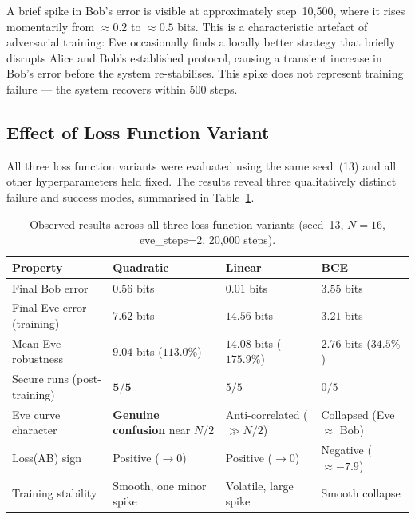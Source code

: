 \documentclass[12pt, a4paper]{article}
\begin{document}
A brief spike in Bob's error is visible at approximately step~10{,}500,
where it rises momentarily from $\approx 0.2$ to $\approx 0.5$ bits.
This is a characteristic artefact of adversarial training: Eve
occasionally finds a locally better strategy that briefly disrupts
Alice and Bob's established protocol, causing a transient increase
in Bob's error before the system re-stabilises. This spike does not
represent training failure --- the system recovers within 500 steps.

\subsection{Effect of Loss Function Variant}
\label{subsec:loss_variant_results}

All three loss function variants were evaluated using the same seed~(13)
and all other hyperparameters held fixed. The results reveal three
qualitatively distinct failure and success modes, summarised in
Table~\ref{tab:loss_variant_results}.

\begin{table}[H]
  \centering
  \caption{Observed results across all three loss function variants
           (seed~13, $N=16$, eve\_steps=2, 20{,}000 steps).}
  \label{tab:loss_variant_results}
  \renewcommand{\arraystretch}{1.5}
  \begin{tabularx}{\linewidth}{@{} l X X X @{}}
    \toprule
    \textbf{Property} & \textbf{Quadratic} &
    \textbf{Linear} & \textbf{BCE} \\
    \midrule
    Final Bob error &
      $\mathbf{0.56}$ bits &
      $0.01$ bits &
      $3.55$ bits \\[4pt]
    Final Eve error (training) &
      $\mathbf{7.62}$ bits &
      $14.56$ bits &
      $3.21$ bits \\[4pt]
    Mean Eve robustness &
      $\mathbf{9.04}$ bits ($113.0\%$) &
      $14.08$ bits ($175.9\%$) &
      $2.76$ bits ($34.5\%$) \\[4pt]
    Secure runs (post-training) &
      $\mathbf{5/5}$ &
      $5/5$ &
      $0/5$ \\[4pt]
    Eve curve character &
      \textbf{Genuine confusion} near $N/2$ &
      Anti-correlated ($\gg N/2$) &
      Collapsed (Eve $\approx$ Bob) \\[4pt]
    Loss(AB) sign &
      Positive ($\to 0$) &
      Positive ($\to 0$) &
      Negative ($\approx -7.9$) \\[4pt]
    Training stability &
      Smooth, one minor spike &
      Volatile, large spike &
      Smooth collapse \\
    \bottomrule
  \end{tabularx}
\end{table}
\end{document}
